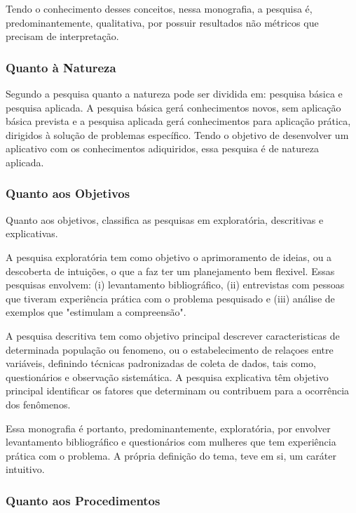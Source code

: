 Tendo o conhecimento desses conceitos, nessa monografia, a pesquisa é, predominantemente, 
qualitativa, por possuir resultados não métricos que precisam de interpretação. 


\subsubsection{Quanto à Natureza}

Segundo \cite{gerhardt2009} a pesquisa quanto a natureza pode ser dividida em: pesquisa 
básica e pesquisa aplicada. A pesquisa básica gerá conhecimentos novos, sem aplicação básica 
prevista e a pesquisa aplicada gerá conhecimentos para aplicação prática, dirigidos à solução de 
problemas específico. Tendo o objetivo de desenvolver um aplicativo com os conhecimentos 
adiquiridos, essa pesquisa é de natureza aplicada.


\subsubsection{Quanto aos Objetivos}

Quanto aos objetivos,  classifica as pesquisas em exploratória, 
descritivas e explicativas. 

A pesquisa exploratória tem como objetivo o aprimoramento 
de ideias, ou a descoberta de intuições, o que a faz ter um planejamento bem flexivel. 
Essas pesquisas envolvem: (i) levantamento bibliográfico, (ii) entrevistas com pessoas 
que tiveram experiência prática com o problema pesquisado e (iii) análise de exemplos que 
"estimulam a compreensão".


A pesquisa descritiva tem como objetivo principal descrever caracteristicas de determinada 
população ou fenomeno, ou o estabelecimento de relaçoes entre variáveis, definindo técnicas 
padronizadas de coleta de dados, tais como, questionários e observação sistemática. A 
pesquisa explicativa têm objetivo principal identificar os fatores que determinam ou contribuem 
para a ocorrência  dos fenômenos. 

Essa monografia é portanto, predominantemente, exploratória, 
por envolver levantamento bibliográfico e questionários com mulheres que tem experiência 
prática com o problema. A própria definição do tema, teve em si, um caráter intuitivo. 

\subsubsection{Quanto aos Procedimentos}

